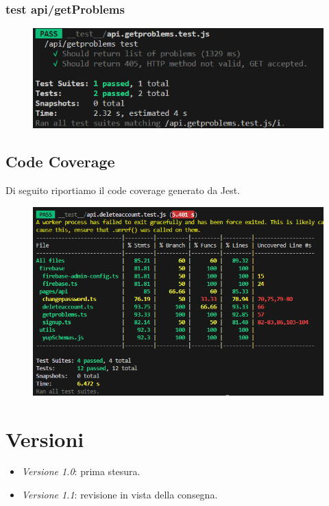 \documentclass[11pt, a4paper]{article}
\theoremstyle{definition}
\begin{document}
\subsubsection{test api/getProblems}

\begin{figure}[H]
  \centering
  \includegraphics[width = \textwidth]{materiale/testing/GetProblems.png}
\end{figure}

\newpage
\subsection{Code Coverage}
Di seguito riportiamo il code coverage generato da Jest.
\begin{figure}[H]
  \centering
  \includegraphics[scale = 1]{materiale/testing/Code Coverage.png}
\end{figure}

\newpage
\section*{Versioni}
\begin{itemize}
  \item \textit{Versione 1.0}: prima stesura.
  \item \textit{Versione 1.1}: revisione in vista della consegna.
\end{itemize}
\end{document}
